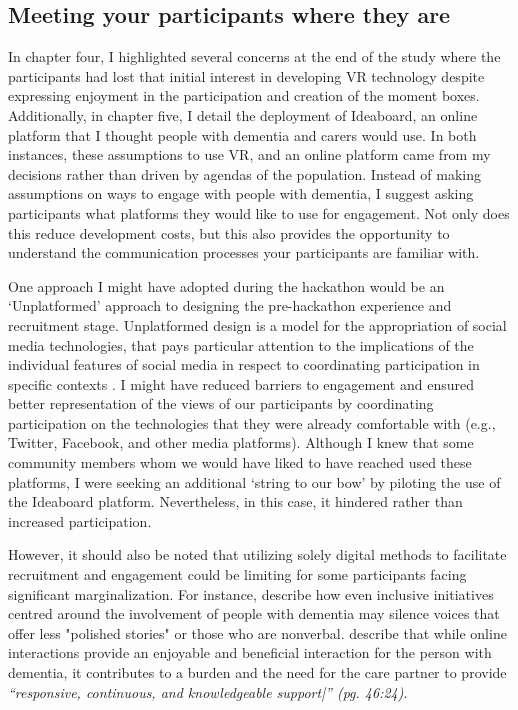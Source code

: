 \subsection{Meeting your participants where they are}
\label{Discussion:WhereTheyAre}
In chapter four, I highlighted several concerns at the end of the study where the participants had lost that initial interest in developing VR technology despite expressing enjoyment in the participation and creation of the moment boxes. Additionally, in chapter five, I detail the deployment of Ideaboard, an online platform that I thought people with dementia and carers would use. In both instances, these assumptions to use VR, and an online platform came from my decisions rather than driven by agendas of the population. Instead of making assumptions on ways to engage with people with dementia, I suggest asking participants what platforms they would like to use for engagement. Not only does this reduce development costs, but this also provides the opportunity to understand the communication processes your participants are familiar with. 

One approach I might have adopted during the hackathon would be an ‘Unplatformed’ approach to designing the pre-hackathon experience and recruitment stage. Unplatformed design is a model for the appropriation of social media technologies, that pays particular attention to the implications of the individual features of social media in respect to coordinating participation in specific contexts \citep{lambton-howard_unplatformed_2020}. I might have reduced barriers to engagement and ensured better representation of the views of our participants by coordinating participation on the technologies that they were already comfortable with (e.g., Twitter, Facebook, and other media platforms). Although I knew that some community members whom we would have liked to have reached used these platforms, I were seeking an additional ‘string to our bow’ by piloting the use of the Ideaboard platform. Nevertheless, in this case, it hindered rather than increased participation. 

However, it should also be noted that utilizing solely digital methods to facilitate recruitment and engagement could be limiting for some participants facing significant marginalization. For instance, \citep{lazar_safe_2019} describe how even inclusive initiatives centred around the involvement of people with dementia may silence voices that offer less "polished stories" or those who are nonverbal. \cite{dai2020making} describe that while online interactions provide an enjoyable and beneficial interaction for the person with dementia, it contributes to a burden and the need for the care partner to provide \textit{“responsive, continuous, and knowledgeable support|” (pg. 46:24)\citep{hwang2020exploring}}. 


